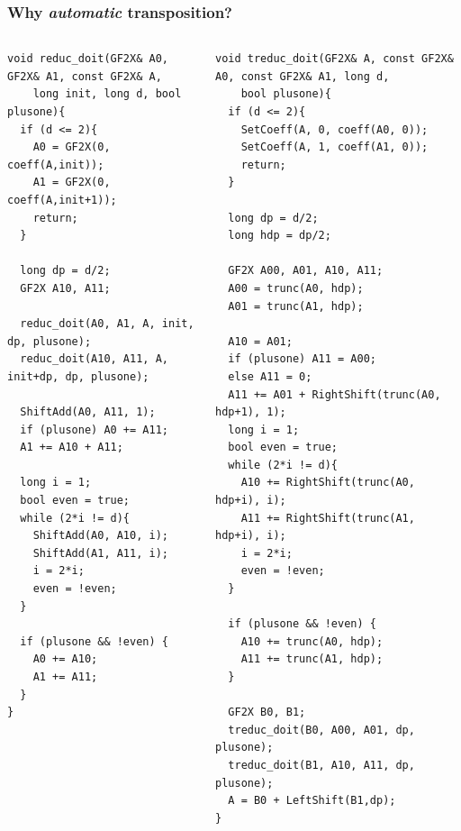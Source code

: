 \documentclass[10pt]{beamer}
\begin{document}

\begin{frame}[fragile]
  \tiny
  \frametitle{Why \emph{automatic} transposition?}

  \begin{columns}
    \begin{column}{0.5\textwidth}
      \begin{center}
        \begin{minipage}{\textwidth}
\begin{verbatim}
void reduc_doit(GF2X& A0, GF2X& A1, const GF2X& A,
	long init, long d, bool plusone){
  if (d <= 2){
    A0 = GF2X(0, coeff(A,init));
    A1 = GF2X(0, coeff(A,init+1));
    return;
  }
   
  long dp = d/2;
  GF2X A10, A11;

  reduc_doit(A0, A1, A, init, dp, plusone);
  reduc_doit(A10, A11, A, init+dp, dp, plusone);
 
  ShiftAdd(A0, A11, 1);
  if (plusone) A0 += A11;
  A1 += A10 + A11;

  long i = 1;
  bool even = true;
  while (2*i != d){
    ShiftAdd(A0, A10, i);
    ShiftAdd(A1, A11, i);
    i = 2*i;
    even = !even;
  }
  
  if (plusone && !even) {
    A0 += A10;
    A1 += A11;
  }
}
\end{verbatim}
        \end{minipage}
      \end{center}
    \end{column}

    \begin{column}{0.5\textwidth}
      \begin{center}
        \begin{minipage}{\textwidth}
\begin{verbatim}
void treduc_doit(GF2X& A, const GF2X& A0, const GF2X& A1, long d,
	bool plusone){
  if (d <= 2){
    SetCoeff(A, 0, coeff(A0, 0));
    SetCoeff(A, 1, coeff(A1, 0));
    return;
  }
   
  long dp = d/2;
  long hdp = dp/2;

  GF2X A00, A01, A10, A11;
  A00 = trunc(A0, hdp);
  A01 = trunc(A1, hdp);

  A10 = A01;
  if (plusone) A11 = A00;
  else A11 = 0;
  A11 += A01 + RightShift(trunc(A0, hdp+1), 1);
  long i = 1;
  bool even = true;
  while (2*i != d){
    A10 += RightShift(trunc(A0, hdp+i), i);
    A11 += RightShift(trunc(A1, hdp+i), i);
    i = 2*i;
    even = !even;
  }
  
  if (plusone && !even) {
    A10 += trunc(A0, hdp);
    A11 += trunc(A1, hdp);
  }
  
  GF2X B0, B1;
  treduc_doit(B0, A00, A01, dp, plusone);
  treduc_doit(B1, A10, A11, dp, plusone);
  A = B0 + LeftShift(B1,dp);
}
\end{verbatim}
        \end{minipage}
      \end{center}
    \end{column}
    \end{columns}
\end{frame}
\end{document}
